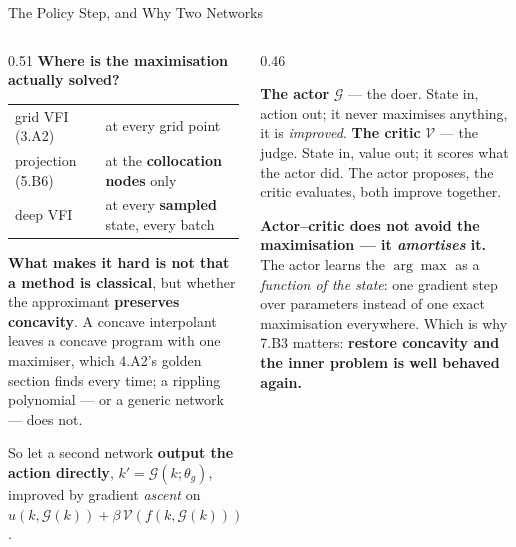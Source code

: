 \begin{frame}{The Policy Step, and Why Two Networks}
\begin{columns}[T]
\begin{column}{0.51\textwidth}
\small
\textbf{Where is the maximisation actually solved?}
\smallskip

\begin{center}\footnotesize
\begin{tabularx}{\linewidth}{@{}>{\raggedright\arraybackslash}p{2.2cm} >{\raggedright\arraybackslash}X@{}}
\toprule
grid VFI (3.A2) & at every grid point \\
projection (5.B6) & at the \textbf{collocation nodes} only \\
deep VFI & at every \textbf{sampled} state, every batch \\
\bottomrule
\end{tabularx}
\end{center}
\smallskip

\textbf{What makes it hard is not that a method is classical}, but whether the approximant \textbf{preserves concavity}. A concave interpolant leaves a concave program with one maximiser, which 4.A2's golden section finds every time; a rippling polynomial --- or a generic network --- does not.
\smallskip

So let a second network \textbf{output the action directly}, $k'=\mathcal{G}(k;\theta_g)$, improved by gradient \emph{ascent} on $u(k,\mathcal{G}(k))+\beta\,\mathcal{V}(f(k,\mathcal{G}(k)))$.
\end{column}
\begin{column}{0.46\textwidth}
\begin{conceptbox}[title=\textbf{The two roles}]\footnotesize
\textbf{The actor} $\mathcal{G}$ --- the doer. State in, action out; it never maximises anything, it is \emph{improved}.
\medskip
\textbf{The critic} $\mathcal{V}$ --- the judge. State in, value out; it scores what the actor did. The actor proposes, the critic evaluates, both improve together.
\end{conceptbox}
\medskip
\begin{takeawaybox}\footnotesize
\textbf{Actor--critic does not avoid the maximisation --- it \emph{amortises} it.} The actor learns the $\arg\max$ as a \emph{function of the state}: one gradient step over parameters instead of one exact maximisation everywhere.
\medskip
Which is why 7.B3 matters: \textbf{restore concavity and the inner problem is well behaved again.}
\end{takeawaybox}
\end{column}
\end{columns}
\end{frame}

